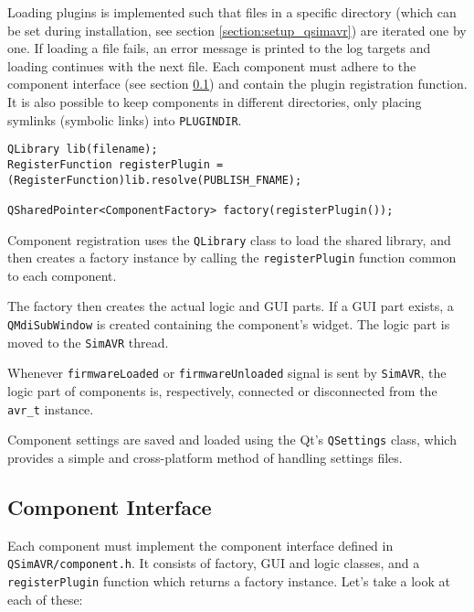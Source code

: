 Loading plugins is implemented such that files in a specific directory (which can be
set during installation, see section \ref{section:setup_qsimavr}) are iterated
one by one. If loading a file fails, an error message is printed to the log targets
and loading continues with the next file. Each component must adhere to the
component interface (see section \ref{subsection:component_interface}) and contain
the plugin registration function.
It is also possible to keep components
in different directories, only placing symlinks (symbolic links) into
\lstinline|PLUGINDIR|.

\begin{lstlisting}
QLibrary lib(filename);
RegisterFunction registerPlugin = (RegisterFunction)lib.resolve(PUBLISH_FNAME);

QSharedPointer<ComponentFactory> factory(registerPlugin());
\end{lstlisting}

Component registration uses the \lstinline|QLibrary| class to load the shared library,
and then creates a factory instance by calling the \lstinline|registerPlugin|
function common to each component.

The factory then creates the actual logic and \ac{GUI} parts. If a \ac{GUI} part
exists, a \lstinline|QMdiSubWindow| is created containing the component's widget.
The logic part is moved to the \lstinline|SimAVR| thread.

Whenever \lstinline|firmwareLoaded| or \lstinline|firmwareUnloaded| signal is sent
by \lstinline|SimAVR|, the logic part of components is, respectively, connected
or disconnected from the \lstinline|avr_t| instance.

Component settings are saved and loaded using the Qt's \lstinline|QSettings|
class, which provides a simple and cross-platform method of handling settings
files.


\subsection{Component Interface} \label{subsection:component_interface}

Each component must implement the component interface defined in
\verb|QSimAVR/component.h|. It consists of factory, \ac{GUI} and logic classes,
and a \lstinline|registerPlugin| function which returns a factory instance. Let's
take a look at each of these:

